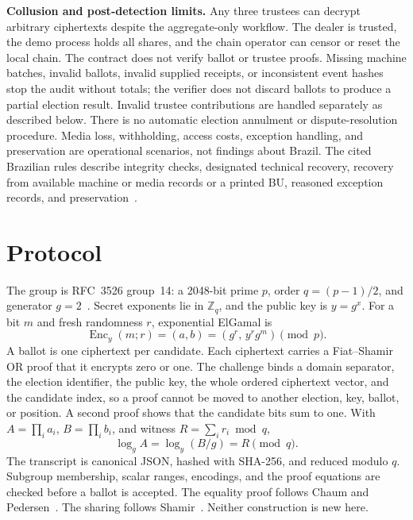 \documentclass[11pt]{article}
\begin{document}
\textbf{Collusion and post-detection limits.} Any three trustees can decrypt arbitrary ciphertexts despite the aggregate-only workflow. The dealer is trusted, the demo process holds all shares, and the chain operator can censor or reset the local chain. The contract does not verify ballot or trustee proofs. Missing machine batches, invalid ballots, invalid supplied receipts, or inconsistent event hashes stop the audit without totals; the verifier does not discard ballots to produce a partial election result. Invalid trustee contributions are handled separately as described below. There is no automatic election annulment or dispute-resolution procedure. Media loss, withholding, access costs, exception handling, and preservation are operational scenarios, not findings about Brazil. The cited Brazilian rules describe integrity checks, designated technical recovery, recovery from available machine or media records or a printed BU, reasoned exception records, and preservation~\cite{tseResolution}.

\section{Protocol}
The group is RFC~3526 group~14: a 2048-bit prime $p$, order $q=(p-1)/2$, and generator $g=2$~\cite{rfc3526}. Secret exponents lie in $\mathbb{Z}_q$, and the public key is $y=g^x$. For a bit $m$ and fresh randomness $r$, exponential ElGamal is
\begin{equation}
  \operatorname{Enc}_y(m;r)=(a,b)=(g^r,\, y^r g^m) \pmod{p}.
\end{equation}
A ballot is one ciphertext per candidate. Each ciphertext carries a Fiat--Shamir OR proof that it encrypts zero or one. The challenge binds a domain separator, the election identifier, the public key, the whole ordered ciphertext vector, and the candidate index, so a proof cannot be moved to another election, key, ballot, or position. A second proof shows that the candidate bits sum to one. With $A=\prod_i a_i$, $B=\prod_i b_i$, and witness $R=\sum_i r_i \bmod q$,
\begin{equation}
  \log_g A = \log_y(B/g) = R \pmod{q}.
\end{equation}
The transcript is canonical JSON, hashed with SHA-256, and reduced modulo $q$. Subgroup membership, scalar ranges, encodings, and the proof equations are checked before a ballot is accepted. The equality proof follows Chaum and Pedersen~\cite{chaum1993wallet}. The sharing follows Shamir~\cite{shamir1979}. Neither construction is new here.
\end{document}
